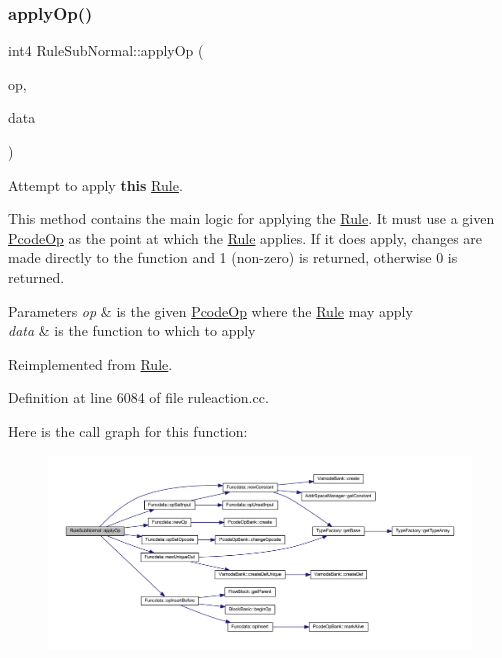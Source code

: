 \subsubsection{\texorpdfstring{applyOp()}{applyOp()}}
{\footnotesize\ttfamily int4 Rule\+Sub\+Normal\+::apply\+Op (\begin{DoxyParamCaption}\item[{\mbox{\hyperlink{class_pcode_op}{Pcode\+Op}} $\ast$}]{op,  }\item[{\mbox{\hyperlink{class_funcdata}{Funcdata}} \&}]{data }\end{DoxyParamCaption})\hspace{0.3cm}{\ttfamily [virtual]}}



Attempt to apply {\bfseries{this}} \mbox{\hyperlink{class_rule}{Rule}}. 

This method contains the main logic for applying the \mbox{\hyperlink{class_rule}{Rule}}. It must use a given \mbox{\hyperlink{class_pcode_op}{Pcode\+Op}} as the point at which the \mbox{\hyperlink{class_rule}{Rule}} applies. If it does apply, changes are made directly to the function and 1 (non-\/zero) is returned, otherwise 0 is returned. 
\begin{DoxyParams}{Parameters}
{\em op} & is the given \mbox{\hyperlink{class_pcode_op}{Pcode\+Op}} where the \mbox{\hyperlink{class_rule}{Rule}} may apply \\
\hline
{\em data} & is the function to which to apply \\
\hline
\end{DoxyParams}


Reimplemented from \mbox{\hyperlink{class_rule_a4e3e61f066670175009f60fb9dc60848}{Rule}}.



Definition at line 6084 of file ruleaction.\+cc.

Here is the call graph for this function\+:
\nopagebreak
\begin{figure}[H]
\begin{center}
\leavevmode
\includegraphics[width=350pt]{class_rule_sub_normal_a257e214dcabe37990f299a02912c75c2_cgraph}
\end{center}
\end{figure}
\mbox{\label{class_rule_sub_normal_a04e245995224e1a60ab407ba3ad4696a}} 
